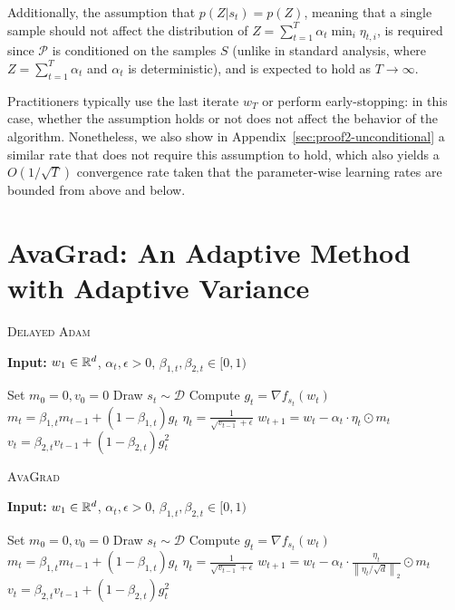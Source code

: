 \documentclass{article}
\newcommand{\norm}[1]{\left\lVert{#1}\right\rVert}
\newcommand{\currw}{w_t}
\newcommand{\nextw}{w_{t+1}}
\newcommand{\w}{w}
\newcommand{\fst}{f_{s_t}}
\newcommand{\currg}{g_t}
\newcommand{\prevm}{m_{t-1}}
\newcommand{\currm}{m_t}
\newcommand{\prevv}{v_{t-1}}
\newcommand{\currv}{v_t}
\newcommand{\curre}{\eta_t}
\newcommand{\currei}{\eta_{t,i}}
\newcommand{\curra}{\alpha_t}
\newcommand{\btwot}{\beta_{2,t}}
\newcommand{\bonet}{\beta_{1,t}}
\newcommand{\dist}{\mathcal D}
\begin{document}
Additionally, the assumption that $p(Z|s_t) = p(Z)$, meaning that a single
sample should not affect the distribution of
$Z = \sum_{t=1}^T \alpha_t \min_i \currei$, is required since $\mathcal P$ is
conditioned on the samples $S$ (unlike in standard analysis, where
$Z = \sum_{t=1}^T \curra$ and $\curra$ is deterministic), and is expected to
hold as $T \to \infty$.

Practitioners typically use the last iterate $w_T$ or
perform early-stopping: in this case, whether the assumption holds or not does
not affect the behavior of the algorithm.  Nonetheless, we also show in
Appendix~\ref{sec:proof2-unconditional} a similar rate that does not require
this assumption to hold, which also yields a $O(1 / \sqrt T)$ convergence rate
taken that the parameter-wise learning rates are bounded from above and below.
 \section{AvaGrad: An Adaptive Method with Adaptive Variance}
\label{sec:ava}
\begin{algorithm}[t]
   \caption{\textsc{Delayed Adam}}
   \label{alg:dadam}
   \textbf{Input:}
      $\w_1 \in \R^d$, $\curra, \epsilon>0$, $\bonet, \btwot \in [0,1)$
   \begin{algorithmic}[1]
      \State Set $m_0 = 0, v_0 = 0$
         \State Draw $s_t \sim \dist$
         \State Compute $\currg = \nabla \fst(\currw)$
         \State $\currm = \bonet \prevm + (1-\bonet) \currg$
         \State $\curre = \frac{1}{\sqrt{\prevv} + \epsilon}$
         \State $\nextw = \currw - \curra \cdot \curre \odot \currm$
         \State $\currv = \btwot \prevv + (1-\btwot) \currg^2$
      \EndFor
   \end{algorithmic}
\end{algorithm}
 
\begin{algorithm}[t]
   \caption{\textsc{AvaGrad}}
   \label{alg:avagrad}
   \textbf{Input:}
      $\w_1 \in \R^d$, $\curra, \epsilon>0$, $\bonet, \btwot \in [0,1)$
   \begin{algorithmic}[1]
      \State Set $m_0 = 0, v_0 = 0$
         \State Draw $s_t \sim \dist$
         \State Compute $\currg = \nabla \fst(\currw)$
         \State $\currm = \bonet \prevm + (1-\bonet) \currg$
         \State $\curre = \frac{1}{\sqrt{\prevv} + \epsilon}$
         \State $\nextw = \currw - \curra \cdot \frac{\curre}{ \norm{\curre / \sqrt d}_2} \odot \currm$
         \State $\currv = \btwot \prevv + (1-\btwot) \currg^2$
      \EndFor
   \end{algorithmic}
\end{algorithm}
 
\end{document}
